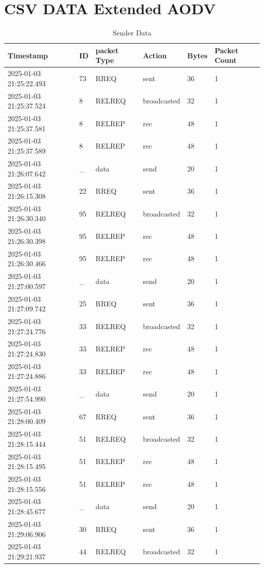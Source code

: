 \documentclass[]{nsm-thesis}
\begin{document}
\chapter{CSV DATA Extended AODV}
\begin{longtable}{llllll}
\caption{Sender Data} \label{tab:sender} \\
\toprule
Timestamp & ID & packet Type & Action & Bytes & Packet Count \\
\midrule
2025-01-03 21:25:22.493 & 73 & RREQ & sent & 36 & 1 \\
2025-01-03 21:25:37.524 & 8 & RELREQ & broadcasted & 32 & 1 \\
2025-01-03 21:25:37.581 & 8 & RELREP & rec & 48 & 1 \\
2025-01-03 21:25:37.589 & 8 & RELREP & rec & 48 & 1 \\
2025-01-03 21:26:07.642 & _ & data & send & 20 & 1 \\
2025-01-03 21:26:15.308 & 22 & RREQ & sent & 36 & 1 \\
2025-01-03 21:26:30.340 & 95 & RELREQ & broadcasted & 32 & 1 \\
2025-01-03 21:26:30.398 & 95 & RELREP & rec & 48 & 1 \\
2025-01-03 21:26:30.466 & 95 & RELREP & rec & 48 & 1 \\
2025-01-03 21:27:00.597 & _ & data & send & 20 & 1 \\
2025-01-03 21:27:09.742 & 25 & RREQ & sent & 36 & 1 \\
2025-01-03 21:27:24.776 & 33 & RELREQ & broadcasted & 32 & 1 \\
2025-01-03 21:27:24.830 & 33 & RELREP & rec & 48 & 1 \\
2025-01-03 21:27:24.886 & 33 & RELREP & rec & 48 & 1 \\
2025-01-03 21:27:54.990 & _ & data & send & 20 & 1 \\
2025-01-03 21:28:00.409 & 67 & RREQ & sent & 36 & 1 \\
2025-01-03 21:28:15.444 & 51 & RELREQ & broadcasted & 32 & 1 \\
2025-01-03 21:28:15.495 & 51 & RELREP & rec & 48 & 1 \\
2025-01-03 21:28:15.556 & 51 & RELREP & rec & 48 & 1 \\
2025-01-03 21:28:45.677 & _ & data & send & 20 & 1 \\
2025-01-03 21:29:06.906 & 30 & RREQ & sent & 36 & 1 \\
2025-01-03 21:29:21.937 & 44 & RELREQ & broadcasted & 32 & 1 \\

\end{longtable}
\end{document}
